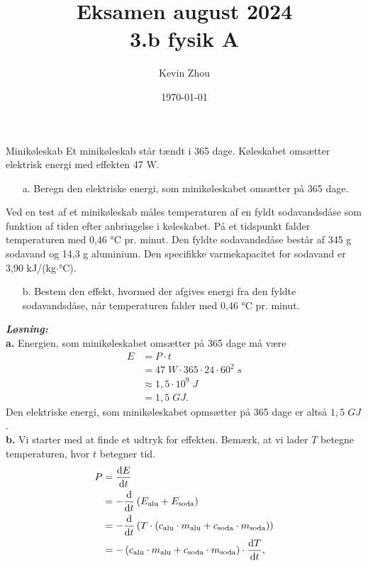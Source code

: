 \documentclass{report}
\title{Eksamen august 2024\\
{\Large \textbf{3.b fysik A}}}
\author{Kevin Zhou}
\date{\today}
\newcommand{\sol}{\setlength{\parindent}{0cm}\textbf{\textit{Løsning:}}\setlength{\parindent}{1cm}}
\begin{document}
\maketitle
\begin{question}{Minikøleskab}{}
  Et minikøleskab står tændt i 365 dage. Køleskabet omsætter elektrisk energi med effekten 47 W. 
  \begin{itemize}
    \item[a.] Beregn den elektriske energi, som minikøleskabet omsætter på 365 dage.
  \end{itemize}
  Ved en test af et minikøleskab måles temperaturen af en fyldt sodavandsdåse som funktion af tiden efter anbringelse i køleskabet. På et tidspunkt falder temperaturen med 0,46 °C pr. minut. 
  Den fyldte sodavandsdåse består af 345 g sodavand og 14,3 g aluminium. Den specifikke varmekapacitet for sodavand er 3,90 kJ/(kg$\cdot$°C).
\begin{itemize}
  \item[b.] Bestem den effekt, hvormed der afgives energi fra den fyldte sodavandsdåse, når temperaturen falder med 0,46 °C pr. minut.
\end{itemize}
\end{question}
\sol \\
\textbf{a.}
Energien, som minikøleskabet omsætter på 365 dage må være
\begin{equation*}
\begin{split}
  E &= P \cdot t \\
  &=47 \;\unit{W}  \cdot 365 \cdot 24 \cdot 60^2 \;\unit{s} \\
  &\approx 1,5 \cdot 10 ^{9} \;\unit{J} \\
  &=1,5 \;\unit{GJ}.
\end{split}
\end{equation*}
Den elektriske energi, som minikøleskabet opmsætter på 365 dage er altså $1,5 \;\unit{GJ} $. \\[1ex]
\textbf{b.}
Vi starter med at finde et udtryk for effekten.
Bemærk, at vi lader $T$ betegne temperaturen, hvor $t$ betegner tid. 
\begin{equation*}
\begin{split}
  P&=\dv{E}{t}\\
  &=-\dv{t} \left(E _{\text{alu}} + E _{\text{soda}}\right) \\
  &=-\dv{t} \left(T \cdot \left(c _{\text{alu}}\cdot m _{\text{alu}} + c _{\text{soda}} \cdot m _{\text{soda}}\right) \right) \\
  &=-\left(c _{\text{alu}}\cdot m _{\text{alu}} + c _{\text{soda}} \cdot m _{\text{soda}}\right) \cdot \dv{T}{t},
\end{split}
\end{equation*}
\end{document}
